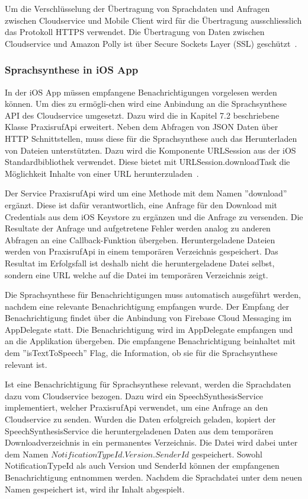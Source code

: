 Um die Verschlüsselung der Übertragung von Sprachdaten und Anfragen zwischen Cloudservice und Mobile Client wird für die Übertragung ausschliesslich das Protokoll HTTPS verwendet.
Die Übertragung von Daten zwischen Cloudservice und Amazon Polly ist über Secure Sockets Layer (SSL) geschützt~\cite{aws_polly_encryption_in_transit}.

\subsubsection{Sprachsynthese in iOS App}

In der iOS App müssen empfangene Benachrichtigungen vorgelesen werden können.
Um dies zu ermögli-chen wird eine Anbindung an die Sprachsynthese API des Cloudservice umgesetzt.
Dazu wird die in Kapitel 7.2 beschriebene Klasse PraxisrufApi erweitert.
Neben dem Abfragen von JSON Daten über HTTP Schnittstellen, muss diese für die Sprachsynthese auch das Herunterladen von Dateien unterstützten.
Dazu wird die Komponente URLSession aus der iOS Standardbibliothek verwendet.
Diese bietet mit URLSession.downloadTask die Möglichkeit Inhalte von einer URL herunterzuladen~\cite{ios_downloadtask}.

Der Service PraxisrufApi wird um eine Methode mit dem Namen ''download'' ergänzt.
Diese ist dafür verantwortlich, eine Anfrage für den Download mit Credentials aus dem iOS Keystore zu ergänzen und die Anfrage zu versenden.
Die Resultate der Anfrage und aufgetretene Fehler werden analog zu anderen Abfragen an eine Callback-Funktion übergeben.
Heruntergeladene Dateien werden von PraxisrufApi in einem temporären Verzeichnis gespeichert.
Das Resultat im Erfolgsfall ist deshalb nicht die heruntergeladene Datei selbst, sondern eine URL welche auf die Datei im temporären Verzeichnis zeigt.

Die Sprachsynthese für Benachrichtigungen muss automatisch ausgeführt werden, nachdem eine relevante Benachrichtigung empfangen wurde.
Der Empfang der Benachrichtigung findet über die Anbindung von Firebase Cloud Messaging im AppDelegate statt.
Die Benachrichtigung wird im AppDelegate empfangen und an die Applikation übergeben.
Die empfangene Benachrichtigung beinhaltet mit dem ''isTextToSpeech'' Flag, die Information, ob sie für die Sprachsynthese relevant ist.

Ist eine Benachrichtigung für Sprachsynthese relevant, werden die Sprachdaten dazu vom Cloudservice bezogen.
Dazu wird ein SpeechSynthesisService implementiert, welcher PraxisrufApi verwendet, um eine Anfrage an den Cloudservice zu senden.
Wurden die Daten erfolgreich geladen, kopiert der SpeechSynthesisService die heruntergeladenen Daten aus dem temporären Downloadverzeichnis in ein permanentes Verzeichnis.
Die Datei wird dabei unter dem Namen $NotificationTypeId.Version.SenderId$ gespeichert.
Sowohl NotificationTypeId als auch Version und SenderId können der empfangenen Benachrichtigung entnommen werden.
Nachdem die Sprachdatei unter dem neuen Namen gespeichert ist, wird ihr Inhalt abgespielt.

